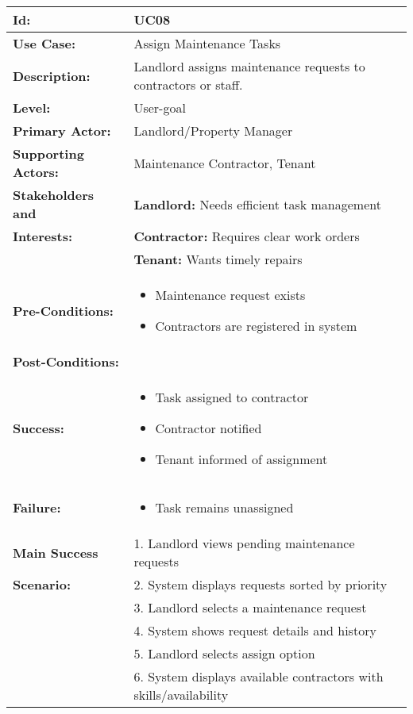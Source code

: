 \documentclass[12pt]{article}
\begin{document}
\begin{longtable}{|p{3cm}|p{11cm}|}
\hline
\textbf{Id:} & UC08 \\
\hline
\textbf{Use Case:} & Assign Maintenance Tasks \\
\hline
\textbf{Description:} & Landlord assigns maintenance requests to contractors or staff. \\
\hline
\textbf{Level:} & User-goal \\
\hline
\textbf{Primary Actor:} & Landlord/Property Manager \\
\hline
\textbf{Supporting Actors:} & Maintenance Contractor, Tenant \\
\hline
\textbf{Stakeholders and} & \textbf{Landlord:} Needs efficient task management \\
\textbf{Interests:} & \textbf{Contractor:} Requires clear work orders \\
& \textbf{Tenant:} Wants timely repairs \\
\hline
\textbf{Pre-Conditions:} & 
\begin{itemize}
    \item Maintenance request exists
    \item Contractors are registered in system
\end{itemize} \\
\hline
\textbf{Post-Conditions:} & \\
\textbf{Success:} & 
\begin{itemize}
    \item Task assigned to contractor
    \item Contractor notified
    \item Tenant informed of assignment
\end{itemize} \\
\textbf{Failure:} & 
\begin{itemize}
    \item Task remains unassigned
\end{itemize} \\
\hline
\textbf{Main Success} & 1. Landlord views pending maintenance requests \\
\textbf{Scenario:} & 2. System displays requests sorted by priority \\
& 3. Landlord selects a maintenance request \\
& 4. System shows request details and history \\
& 5. Landlord selects assign option \\
& 6. System displays available contractors with skills/availability \\

\end{longtable}
\end{document}

